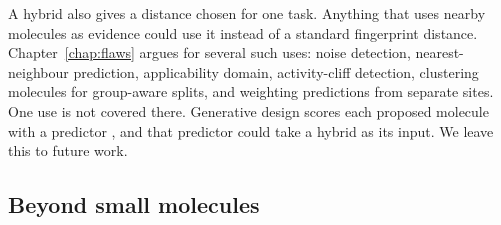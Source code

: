 A hybrid also gives a distance chosen for one task. Anything that uses nearby molecules as evidence could use it instead of a standard fingerprint distance. Chapter~\ref{chap:flaws} argues for several such uses: noise detection, nearest-neighbour prediction, applicability domain, activity-cliff detection, clustering molecules for group-aware splits, and weighting predictions from separate sites. One use is not covered there. Generative design scores each proposed molecule with a predictor \citep{Olivecrona2017}, and that predictor could take a hybrid as its input. We leave this to future work.


\subsection{Beyond small molecules}
